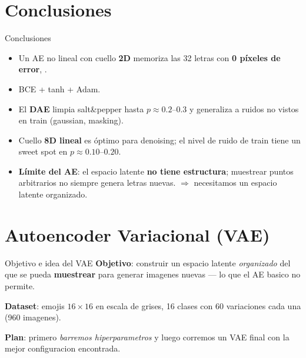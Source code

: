 \documentclass[aspectratio=169, 10pt]{beamer}
\begin{document}

\section{Conclusiones}

\begin{frame}{Conclusiones}
  \begin{itemize}\setlength\itemsep{6pt}
    \item Un AE no lineal con cuello \textbf{2D} memoriza las 32 letras con \textbf{0 píxeles de error},
          .
    \item BCE + tanh + Adam.
    \item El \textbf{DAE} limpia salt\&pepper hasta $p\approx0.2$--$0.3$ y generaliza a ruidos
          no vistos en train (gaussian, masking).
    \item Cuello \textbf{8D lineal} es óptimo para denoising; el nivel de ruido de train tiene
          un sweet spot en $p\approx0.10$--$0.20$.
    \item \textbf{Límite del AE}: el espacio latente \textbf{no tiene estructura}; muestrear
          puntos arbitrarios no siempre genera letras nuevas. $\Rightarrow$ necesitamos un espacio
          latente organizado.
  \end{itemize}
\end{frame}


\section{Autoencoder Variacional (VAE)}

\begin{frame}{Objetivo e idea del VAE}
  \textbf{Objetivo}: construir un espacio latente \emph{organizado} del que se
  pueda \textbf{muestrear} para generar imagenes nuevas --- lo que el AE basico
  no permite.

  \vspace{0.8em}
  \textbf{Dataset}: emojis $16\!\times\!16$ en escala de grises, 16 clases con
  60 variaciones cada una (960 imagenes).

  \vspace{0.8em}
  \textbf{Plan}: primero \emph{barremos hiperparametros} y luego corremos un VAE
  final con la mejor configuracion encontrada.
\end{frame}
\end{document}
